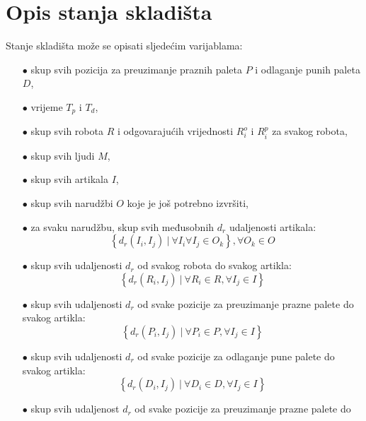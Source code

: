 \documentclass[times, utf8, seminar]{fer}
\begin{document}
\section{Opis stanja skladišta}
Stanje skladišta može se opisati sljedećim varijablama:
\begin{itemize}
    \item[$\bullet$] skup svih pozicija za preuzimanje praznih paleta $P$ i odlaganje punih paleta $D$,
    \item[$\bullet$] vrijeme $T_p$ i $T_d$,
    \item[$\bullet$] skup svih robota $R$ i odgovarajućih vrijednosti $R_{i}^{o}$ i $R_{i}^{p}$ za svakog robota,
    \item[$\bullet$] skup svih ljudi $M$,
    \item[$\bullet$] skup svih artikala $I$,
    \item[$\bullet$] skup svih narudžbi $O$ koje je još potrebno izvršiti,
    \item[$\bullet$] za svaku narudžbu, skup svih međusobnih $d_r$ udaljenosti artikala:
                \begin{equation}
                \label{state-set-01}
                    \left\{ d_r(I_i, I_j)\ |\ \forall I_i \forall I_j \in O_k \right\}, \forall O_k \in O
                \end{equation}
    \item[$\bullet$] skup svih udaljenosti $d_r$ od svakog robota do svakog artikla:
                \begin{equation}
                \label{state-set-02}
                    \left\{ d_r(R_i, I_j)\ |\ \forall R_i \in R, \forall I_j \in I\right\}
                \end{equation}
    \item[$\bullet$] skup svih udaljenosti $d_r$ od svake pozicije za preuzimanje prazne palete do
                     svakog artikla:
                \begin{equation}
                    \left\{d_r(P_i, I_j)\ |\ \forall P_i \in P, \forall I_j \in I\right\}
                \end{equation}
    \item[$\bullet$] skup svih udaljenosti $d_r$ od svake pozicije za odlaganje pune palete do
                     svakog artikla:
                \begin{equation}
                    \left\{d_r(D_i, I_j)\ |\ \forall D_i \in D, \forall I_j \in I\right\}
                \end{equation}
    \item[$\bullet$] skup svih udaljenost $d_r$ od svake pozicije za preuzimanje prazne palete do

\end{itemize}
\end{document}
